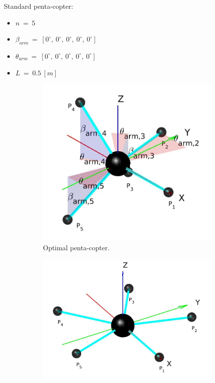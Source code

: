 Standard penta-copter:
\begin{itemize}
  \item $n\ =\ 5$
  \item $\beta_{arm}\ =\ [0^{\circ},\  0^{\circ},\  0^{\circ},\  0^{\circ},\  0^{\circ}]$
  \item $\theta_{arm}\ =\ [0^{\circ},\  0^{\circ},\  0^{\circ},\  0^{\circ},\  0^{\circ}]$
  \item $L\ =\ 0.5\ [m]$
\end{itemize}
\begin{figure}[!h]
  \begin{subfigure}[b]{0.4\textwidth}
    \includegraphics[width=\linewidth]{images/Pentacopter_odd.jpg}
    \caption{Optimal penta-copter.} \label{fig:Pentacopter_odd}
  \end{subfigure}
  \hspace*{\fill} %
  \begin{subfigure}[b]{0.5\textwidth}
    \includegraphics[width=\linewidth]{images/Pentacopter_standard.jpg}

\end{subfigure}
\end{figure}
